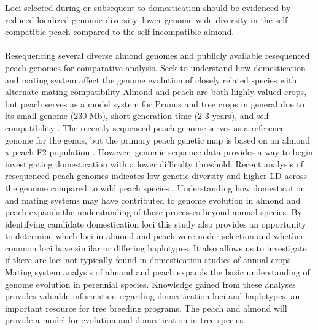 \documentclass[12pt]{article}
\begin{document}
%
Loci selected during or subsequent to domestication should be evidenced by reduced localized genomic diversity.
%
lower genome-wide diversity in the self-compatible peach compared to the self-incompatible almond.
%
%
\\
\\
Resequencing several diverse almond genomes and publicly available resequenced peach genomes for comparative analysis. 
%
Seek to understand how domestication and mating system affect the genome evolution of closely related species with alternate mating compatibility
%
Almond and peach are both highly valued crops, but peach serves as a model system for Prunus and tree crops in general due to its small genome (230 Mb), short generation time (2-3 years), and self-compatibility \citep{arus2012peach}.
%
The recently sequenced peach genome \citep{verde2013high}serves as a reference genome for the genus, but the primary peach genetic map is based on an almond x peach F2 population \citep{arus2012peach, joobeur1998construction, aranzana2003set, dirlewanger2004comparative, dominguez2003plant}.
%
However, genomic sequence data provides a way to begin investigating domestication with a lower difficulty threshold.
%
Recent analysis of resequenced peach genomes indicates low genetic diversity and higher LD across the genome compared to wild peach species \citep{verde2013high}. 
%
%
Understanding how domestication and mating systems may have contributed to genome evolution in almond and peach expands the understanding of these processes beyond annual species. 
%
By identifying candidate domestication loci this study also provides an opportunity to determine which loci in almond and peach were under selection and whether common loci have similar or differing haplotypes. 
%
It also allows us to investigate if there are loci not typically found in domestication studies of annual crops. 
%
Mating system analysis of almond and peach expands the basic understanding of genome evolution in perennial species. 
%
Knowledge gained from these analyses provides valuable information regarding domestication loci and haplotypes, an
important resource for tree breeding programs.
%
The peach and almond will provide a model for evolution and domestication in tree species.
\\
\\
\end{document}
